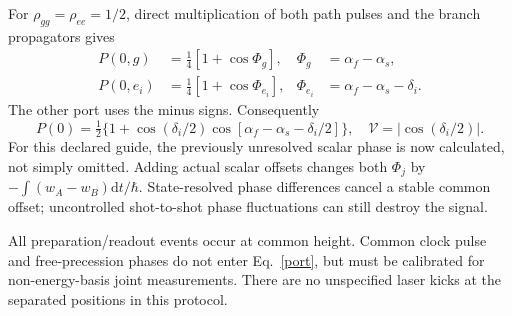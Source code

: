 \documentclass[11pt,a4paper]{article}
\newcommand{\dd}{\mathrm d}
\begin{document}
For $\rho_{gg}=\rho_{ee}=1/2$, direct multiplication of both path
pulses and the branch propagators gives
\begin{align}
 P(0,g)&=\tfrac14[1+\cos\Phi_g],&
 \Phi_g&=\alpha_f-\alpha_s,\\
 P(0,e_i)&=\tfrac14[1+\cos\Phi_{e_i}],&
 \Phi_{e_i}&=\alpha_f-\alpha_s-\delta_i .\label{port}
\end{align}
The other port uses the minus signs. Consequently
\begin{equation}
 P(0)=\tfrac12\{1+\cos(\delta_i/2)
             \cos[\alpha_f-\alpha_s-\delta_i/2]\},\quad
 \mathcal V=|\cos(\delta_i/2)|.\label{visibility}
\end{equation}
For this declared guide, the previously unresolved scalar phase is now
calculated, not simply omitted. Adding actual scalar offsets changes
both $\Phi_j$ by $-\int(w_A-w_B)\dd t/\hbar$. State-resolved phase
differences cancel a stable common offset; uncontrolled shot-to-shot
phase fluctuations can still destroy the signal.

All preparation/readout events occur at common height. Common clock
pulse and free-precession phases do not enter Eq.~\eqref{port}, but
must be calibrated for non-energy-basis joint measurements. There are
no unspecified laser kicks at the separated positions in this protocol.

\newpage
\end{document}
